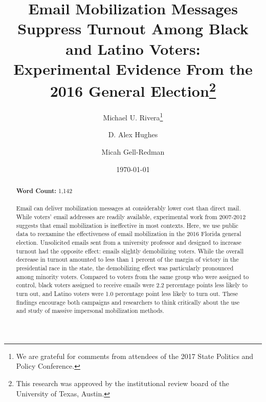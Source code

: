 \documentclass[12pt]{article}
\begin{document}
\author[1]{Michael U. Rivera\thanks{We are grateful for comments from
    attendees of the 2017 State Politics and Policy Conference.}}
\author[1]{D. Alex Hughes} \author[2,3]{Micah Gell-Redman}

\renewcommand\Authands{ and }

\title{Email Mobilization Messages Suppress Turnout Among Black and Latino Voters:\\
  Experimental Evidence From the 2016 General Election\thanks{This
    research was approved by the institutional review board of the
    University of Texas, Austin.}}  \date{\today}


\maketitle
\thispagestyle{empty}

\begin{abstract}
  \noindent \textbf{Word Count:}  1,142 \\ \\
  Email can deliver mobilization messages at considerably lower cost
  than direct mail. While voters’ email addresses are readily
  available, experimental work from 2007-2012 suggests that
  email mobilization is ineffective in most contexts. Here, we use
  public data to reexamine the effectiveness of email mobilization in
  the 2016 Florida general election. Unsolicited emails sent from a
  university professor and designed to increase turnout had the
  opposite effect: emails slightly demobilizing voters. While the overall
  decrease in turnout amounted to less than 1 percent of the margin of
  victory in the presidential race in the state, the demobilizing
  effect was particularly pronounced among minority voters. Compared
  to voters from the same group who were assigned to control, black
  voters assigned to receive emails were 2.2 percentage points less
  likely to turn out, and Latino voters were 1.0 percentage point less
  likely to turn out. These findings encourage both campaigns and
  researchers to think critically about the use and study of massive
  impersonal mobilization methods.

\end{abstract}

\clearpage
\end{document}
